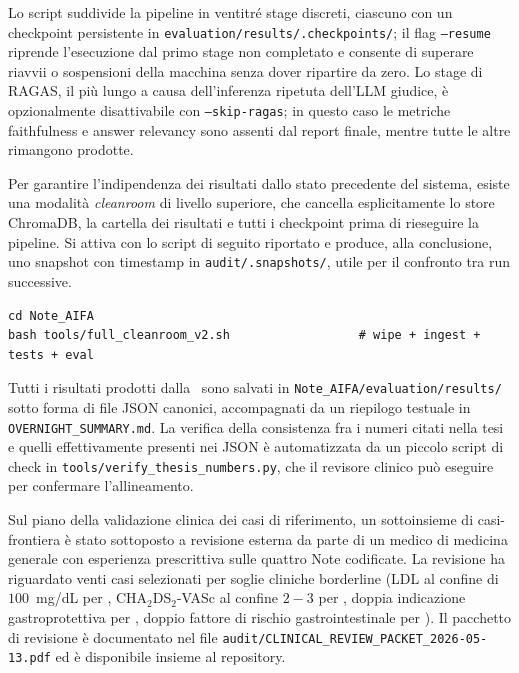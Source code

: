 Lo script suddivide la pipeline in ventitré stage discreti, ciascuno con un checkpoint persistente in \texttt{evaluation/results/.checkpoints/}; il flag \texttt{--resume} riprende l'esecuzione dal primo stage non completato e consente di superare riavvii o sospensioni della macchina senza dover ripartire da zero. Lo stage di RAGAS, il più lungo a causa dell'inferenza ripetuta dell'LLM giudice, è opzionalmente disattivabile con \texttt{--skip-ragas}; in questo caso le metriche faithfulness e answer relevancy sono assenti dal report finale, mentre tutte le altre rimangono prodotte.

Per garantire l'indipendenza dei risultati dallo stato precedente del sistema, esiste una modalità \emph{cleanroom} di livello superiore, che cancella esplicitamente lo store ChromaDB, la cartella dei risultati e tutti i checkpoint prima di rieseguire la pipeline. Si attiva con lo script di seguito riportato e produce, alla conclusione, uno snapshot con timestamp in \texttt{audit/.snapshots/}, utile per il confronto tra run successive.

{\footnotesize
\begin{verbatim}
cd Note_AIFA
bash tools/full_cleanroom_v2.sh                  # wipe + ingest + tests + eval
\end{verbatim}
}

\begin{sloppypar}
Tutti i risultati prodotti dalla \cleanroomrun\ sono salvati in \texttt{Note\_AIFA/\allowbreak evaluation/\allowbreak results/} sotto forma di file JSON canonici, accompagnati da un riepilogo testuale in \texttt{OVERNIGHT\_\allowbreak SUMMARY.md}. La verifica della consistenza fra i numeri citati nella tesi e quelli effettivamente presenti nei JSON è automatizzata da un piccolo script di check in \texttt{tools/\allowbreak verify\_\allowbreak thesis\_\allowbreak numbers.py}, che il revisore clinico può eseguire per confermare l'allineamento.
\end{sloppypar}

Sul piano della validazione clinica dei casi di riferimento, un sottoinsieme di casi-frontiera è stato sottoposto a revisione esterna da parte di un medico di medicina generale con esperienza prescrittiva sulle quattro Note codificate. La revisione ha riguardato venti casi selezionati per soglie cliniche borderline (LDL al confine di $100$~mg/dL per \notetredici, CHA$_2$DS$_2$-VASc al confine $2{-}3$ per \notenova, doppia indicazione gastroprotettiva per \notezero, doppio fattore di rischio gastrointestinale per \notesessanta). Il pacchetto di revisione è documentato nel file \texttt{audit/CLINICAL\_REVIEW\_PACKET\_2026-05-13.pdf} ed è disponibile insieme al repository.
